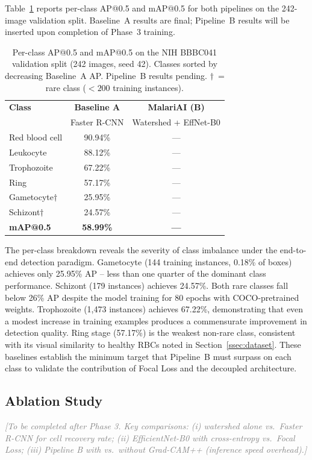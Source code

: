 \documentclass[10pt,twocolumn]{article}
\newcommand{\placeholder}[1]{\textcolor{gray}{\textit{#1}}}
\begin{document}
Table~\ref{tab:results} reports per-class AP@0.5 and mAP@0.5 for both
pipelines on the 242-image validation split. Baseline~A results are final;
Pipeline~B results will be inserted upon completion of Phase~3 training.

\begin{table}[h!]
\centering
\small
\caption{Per-class AP@0.5 and mAP@0.5 on the NIH BBBC041 validation split
  (242 images, seed 42). Classes sorted by decreasing Baseline~A AP.
  Pipeline~B results pending.
  $\dagger$~= rare class ($<200$ training instances).}
\label{tab:results}
\renewcommand{\arraystretch}{1.2}
\begin{tabular}{lcc}
\toprule
\textbf{Class} & \textbf{Baseline A} & \textbf{MalariAI (B)} \\
               & Faster R-CNN        & Watershed + EffNet-B0 \\
\midrule
Red blood cell  & 90.94\% & --- \\
Leukocyte       & 88.12\% & --- \\
Trophozoite     & 67.22\% & --- \\
Ring            & 57.17\% & --- \\
Gametocyte$\dagger$ & 25.95\% & --- \\
Schizont$\dagger$   & 24.57\% & --- \\
\midrule
\textbf{mAP@0.5} & \textbf{58.99\%} & \textbf{---} \\
\bottomrule
\end{tabular}
\end{table}

The per-class breakdown reveals the severity of class imbalance under the
end-to-end detection paradigm. Gametocyte (144 training instances, 0.18\%
of boxes) achieves only 25.95\% AP -- less than one quarter of the dominant
class performance. Schizont (179 instances) achieves 24.57\%. Both rare
classes fall below 26\% AP despite the model training for 80 epochs with
COCO-pretrained weights. Trophozoite (1,473 instances) achieves 67.22\%,
demonstrating that even a modest increase in training examples produces
a commensurate improvement in detection quality. Ring stage (57.17\%) is
the weakest non-rare class, consistent with its visual similarity to
healthy RBCs noted in Section~\ref{ssec:dataset}. These baselines
establish the minimum target that Pipeline~B must surpass on each class
to validate the contribution of Focal Loss and the decoupled architecture.

\subsection{Ablation Study}
\label{ssec:ablation}
\placeholder{[To be completed after Phase 3. Key comparisons:
(i) watershed alone vs.\ Faster R-CNN for cell recovery rate;
(ii) EfficientNet-B0 with cross-entropy vs.\ Focal Loss;
(iii) Pipeline B with vs.\ without Grad-CAM++ (inference speed overhead).]}
\end{document}
